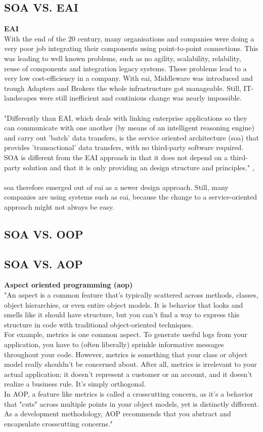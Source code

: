 \documentclass[12pt]{article}
\begin{document}
\subsection{SOA VS. EAI}
\textbf{EAI}\\
With the end of the 20 century, many organisations and companies were doing a very poor job integrating their components using point-to-point connections. This was leading to well known problems, such as no agility, scalability, relability, reuse of components and integration legacy systems. These problems lead to a very low cost-efficiency in a company. With \gls{eai}, Middleware was introduced and trough Adapters and Brokers the whole infrastructure got manageable. Still, IT-landscapes were still inefficient and continious change was nearly impossible. \cite[page 115]{te}
\\
\\
"Differently than EAI, which deals with linking enterprise applications so they can communicate with one another (by means of an intelligent reasoning engine) and carry out 'batch' data transfers, is the service oriented architecture (\gls{soa}) that provides 'transactional' data transfers, with no third-party software required. SOA is different from the EAI approach in that it does not depend on a third-party solution and that it is only providing an design structure and principles." ,\cite{soadef}\\
\\
\gls{soa} therefore emerged out of \gls{eai} as a newer design approach. Still, many companies are using systems such as \gls{eai}, because the change to a service-oriented approach might not always be easy. 
\subsection{SOA VS. OOP}
\subsection{SOA VS. AOP} %
\textbf{Aspect oriented programming (\gls{aop})}\\
"An aspect is a common feature that's typically scattered across methods, classes, object hierarchies, or even entire object models. It is behavior that looks and smells like it should have structure, but you can't find a way to express this structure in code with traditional object-oriented techniques.\\
For example, metrics is one common aspect. To generate useful logs from your application, you have to (often liberally) sprinkle informative messages throughout your code. However, metrics is something that your class or object model really shouldn't be concerned about. After all, metrics is irrelevant to your actual application: it doesn't represent a customer or an account, and it doesn't realize a business rule. It's simply orthogonal.
\\
In AOP, a feature like metrics is called a crosscutting concern, as it's a behavior that "cuts" across multiple points in your object models, yet is distinctly different. As a development methodology, AOP recommends that you abstract and encapsulate crosscutting concerns." \cite{aopdef}
\end{document}
